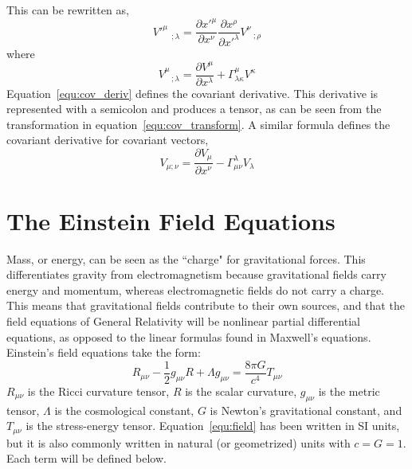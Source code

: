 This can be rewritten as,
\begin{equation}
\label{equ:cov_transform}
    V'^{\mu}_{\;\;\;\;;\lambda} = \frac{\partial x'^{\mu}}{\partial x^{\nu}} \frac{\partial x^{\rho}}{\partial x'^{\lambda}}V^{\nu}_{\;\;\;;\rho}
\end{equation}
where 
\begin{equation}
\label{equ:cov_deriv}
    V^{\mu}_{\;\;\;;\lambda} = \frac{\partial V^{\mu}}{\partial x^{\lambda}} + \Gamma^{\mu}_{\lambda\kappa}V^{\kappa}
\end{equation}
Equation~\ref{equ:cov_deriv} defines the covariant derivative. This derivative is represented with a semicolon and produces a tensor, as can be seen from the transformation in equation~\ref{equ:cov_transform}. A similar formula defines the covariant derivative for covariant vectors,
\begin{equation}
    V_{\mu;\nu} = \frac{\partial V_{\mu}}{\partial x^{\nu}} - \Gamma^{\lambda}_{\mu\nu}V_{\lambda}
\end{equation}

\section{The Einstein Field Equations}

Mass, or energy, can be seen as the ``charge" for gravitational forces. This differentiates gravity from electromagnetism because gravitational fields carry energy and momentum, whereas electromagnetic fields do not carry a charge. This means that gravitational fields contribute to their own sources, and that the field equations of General Relativity will be nonlinear partial differential equations, as opposed to the linear formulas found in Maxwell's equations. Einstein's field equations take the form:
\begin{equation}
\label{equ:field}
    R_{\mu\nu} - \frac{1}{2}g_{\mu\nu}R + \Lambda g_{\mu\nu} = \frac{8\pi G}{c^{4}} T_{\mu\nu}
\end{equation}
$R_{\mu\nu}$ is the Ricci curvature tensor, $R$ is the scalar curvature, $g_{\mu\nu}$ is the metric tensor, $\Lambda$ is the cosmological constant, $G$ is Newton's gravitational constant, and $T_{\mu\nu}$ is the stress-energy tensor. Equation~\ref{equ:field} has been written in SI units, but it is also commonly written in natural (or geometrized) units with $c = G = 1$. Each term will be defined below.

